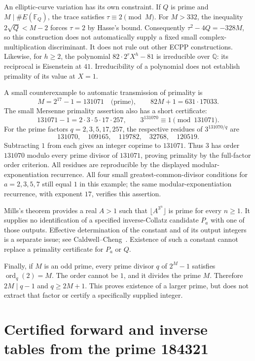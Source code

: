 \documentclass[11pt,a4paper]{article}
\theoremstyle{definition}
\theoremstyle{remark}
\numberwithin{equation}{section}
\begin{document}
An elliptic-curve variation has its own constraint. If $Q$ is prime and
$M\mid\#E(\mathbb F_Q)$, the trace satisfies $\tau\equiv2\pmod M$.
For $M>332$, the inequality $2\sqrt Q<M-2$ forces $\tau=2$ by Hasse's
bound. Consequently $\tau^2-4Q=-328M$, so this construction does not
automatically supply a fixed small complex-multiplication discriminant.
It does not rule out other ECPP constructions.
Likewise, for $h\ge2$, the polynomial $82\cdot2^rX^h-81$ is irreducible
over $\mathbb Q$: its reciprocal is Eisenstein at $41$.
Irreducibility of a polynomial does not establish primality of its value
at $X=1$.

A small counterexample to automatic transmission of primality is
\[
 M=2^{17}-1=131071\quad\text{(prime)},\qquad
 82M+1=631\cdot17033.
\]
The small Mersenne primality assertion also has a short certificate:
\[
131071-1=2\cdot3\cdot5\cdot17\cdot257,\qquad
3^{131070}\equiv1\pmod{131071}.
\]
For the prime factors $q=2,3,5,17,257$, the respective residues of
$3^{131070/q}$ are
\[
131070,\quad109165,\quad119782,\quad32768,\quad120519.
\]
Subtracting $1$ from each gives
an integer coprime to $131071$. Thus $3$ has order $131070$ modulo
every prime divisor of $131071$, proving primality by the full-factor
order criterion. All residues are reproducible by the displayed
modular-exponentiation recurrence.
All four small greatest-common-divisor conditions for $a=2,3,5,7$ still
equal $1$ in this example; the same modular-exponentiation recurrence,
with exponent $17$, verifies this assertion.

Mills's theorem provides a real $A>1$ such that
$\lfloor A^{3^n}\rfloor$ is prime for every $n\ge1$.
It supplies no identification of a specified inverse-Collatz candidate
$P_a$ with one of those outputs. Effective determination of the constant
and of its output integers is a separate issue; see
Caldwell--Cheng~\cite{R015}. Existence of such a constant
cannot replace a primality certificate for $P_a$ or $Q$.

Finally, if $M$ is an odd prime, every prime divisor $q$ of $2^M-1$
satisfies $\operatorname{ord}_q(2)=M$. The order cannot be $1$, and it
divides the prime $M$. Therefore $2M\mid q-1$ and $q\ge2M+1$.
This proves existence of a larger prime, but does not extract that factor
or certify a specifically supplied integer.


\section{Certified forward and inverse tables from the prime 184321}
\label{A:sec:184321}
\end{document}
